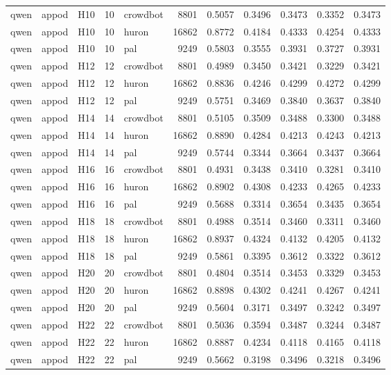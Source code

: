 \begin{table}[tbp]
\begin{tabular}{lllrlrrrrrr}
qwen & appod & H10 & 10 & crowdbot & 8801 & 0.5057 & 0.3496 & 0.3473 & 0.3352 & 0.3473 \\
qwen & appod & H10 & 10 & huron & 16862 & 0.8772 & 0.4184 & 0.4333 & 0.4254 & 0.4333 \\
qwen & appod & H10 & 10 & pal & 9249 & 0.5803 & 0.3555 & 0.3931 & 0.3727 & 0.3931 \\
qwen & appod & H12 & 12 & crowdbot & 8801 & 0.4989 & 0.3450 & 0.3421 & 0.3229 & 0.3421 \\
qwen & appod & H12 & 12 & huron & 16862 & 0.8836 & 0.4246 & 0.4299 & 0.4272 & 0.4299 \\
qwen & appod & H12 & 12 & pal & 9249 & 0.5751 & 0.3469 & 0.3840 & 0.3637 & 0.3840 \\
qwen & appod & H14 & 14 & crowdbot & 8801 & 0.5105 & 0.3509 & 0.3488 & 0.3300 & 0.3488 \\
qwen & appod & H14 & 14 & huron & 16862 & 0.8890 & 0.4284 & 0.4213 & 0.4243 & 0.4213 \\
qwen & appod & H14 & 14 & pal & 9249 & 0.5744 & 0.3344 & 0.3664 & 0.3437 & 0.3664 \\
qwen & appod & H16 & 16 & crowdbot & 8801 & 0.4931 & 0.3438 & 0.3410 & 0.3281 & 0.3410 \\
qwen & appod & H16 & 16 & huron & 16862 & 0.8902 & 0.4308 & 0.4233 & 0.4265 & 0.4233 \\
qwen & appod & H16 & 16 & pal & 9249 & 0.5688 & 0.3314 & 0.3654 & 0.3435 & 0.3654 \\
qwen & appod & H18 & 18 & crowdbot & 8801 & 0.4988 & 0.3514 & 0.3460 & 0.3311 & 0.3460 \\
qwen & appod & H18 & 18 & huron & 16862 & 0.8937 & 0.4324 & 0.4132 & 0.4205 & 0.4132 \\
qwen & appod & H18 & 18 & pal & 9249 & 0.5861 & 0.3395 & 0.3612 & 0.3322 & 0.3612 \\
qwen & appod & H20 & 20 & crowdbot & 8801 & 0.4804 & 0.3514 & 0.3453 & 0.3329 & 0.3453 \\
qwen & appod & H20 & 20 & huron & 16862 & 0.8898 & 0.4302 & 0.4241 & 0.4267 & 0.4241 \\
qwen & appod & H20 & 20 & pal & 9249 & 0.5604 & 0.3171 & 0.3497 & 0.3242 & 0.3497 \\
qwen & appod & H22 & 22 & crowdbot & 8801 & 0.5036 & 0.3594 & 0.3487 & 0.3244 & 0.3487 \\
qwen & appod & H22 & 22 & huron & 16862 & 0.8887 & 0.4234 & 0.4118 & 0.4165 & 0.4118 \\
qwen & appod & H22 & 22 & pal & 9249 & 0.5662 & 0.3198 & 0.3496 & 0.3218 & 0.3496 \\

\end{tabular}
\end{table}
